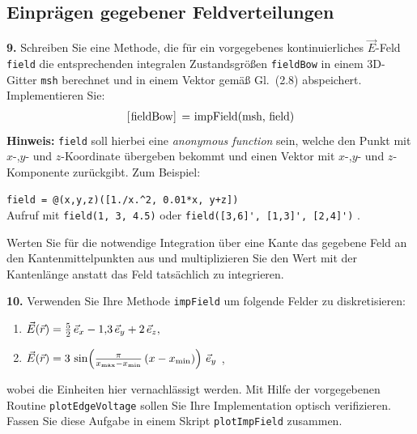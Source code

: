 \documentclass[Protokollheft.tex]{subfiles}
\begin{document}
{\subsection{Einprägen gegebener Feldverteilungen}}

        \begin{framed}
	\noindent \textbf{9.} Schreiben Sie eine Methode, die für ein
        vorgegebenes kontinuierliches $\vec{E}$-Feld \lstinline{field}
        die entsprechenden integralen Zustandsgrößen \lstinline{fieldBow}
        in einem 3D-Gitter \lstinline{msh} berechnet und in einem Vektor gemäß
        Gl.~(2.8) abspeichert. Implementieren Sie:
        \begin{align}
            \lstinline{[fieldBow] = impField(msh, field)}
        \end{align}
        {\textbf{Hinweis:}} \lstinline{field} soll hierbei eine \emph{anonymous function} sein, welche den Punkt mit $x$-,$y$- und $z$-Koordinate übergeben bekommt und einen Vektor mit $x$-,$y$- und $z$-Komponente zurückgibt. Zum Beispiel:
        \begin{center}
            \lstinline{field = @(x,y,z)([1./x.^2, 0.01*x, y+z])}\\
            Aufruf mit \lstinline{field(1, 3, 4.5)} oder \lstinline{field([3,6]', [1,3]', [2,4]')} \; .
        \end{center}
        Werten Sie für die notwendige Integration über eine Kante das gegebene Feld an den Kantenmittelpunkten aus und multiplizieren Sie den Wert mit
        der Kantenlänge anstatt das Feld tatsächlich zu integrieren.\label{exer:impField}
\end{framed}



        \begin{framed}
	\noindent \textbf{10.} Verwenden Sie Ihre Methode \lstinline{impField} um folgende Felder zu diskretisieren:
        \begin{enumerate}
            \item $ \vec{E} (\vec r) = \frac{5}{2}\,  \vec{e}_x - 1,\!3\,  \vec{e}_y + 2\,  \vec{e}_z,$
            \item $ \vec{E} (\vec r) = 3\, \sin\! \left(\frac{\pi}{x_\text{max}-x_\text{min}}\, (x-x_\text{min}) \right)\,  \vec{e}_y$ ,
        \end{enumerate}
        wobei die Einheiten hier vernachlässigt werden. Mit Hilfe der vorgegebenen Routine \lstinline{plotEdgeVoltage} sollen Sie Ihre Implementation optisch verifizieren. Fassen Sie diese Aufgabe in einem Skript \lstinline{plotImpField} zusammen.\label{exer:plotImpField}
\end{framed}
	
\end{document}
